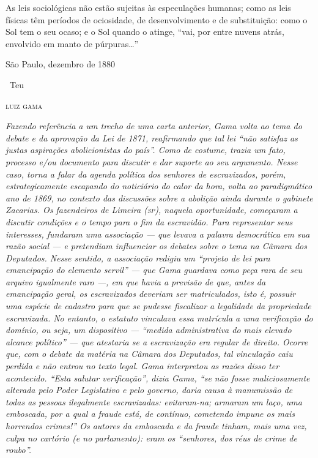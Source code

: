 {As leis sociológicas não estão sujeitas às especulações humanas; como as
leis físicas têm períodos de ociosidade, de desenvolvimento e de
substituição: como o Sol tem o seu ocaso; e o Sol quando o atinge, ``vai,
por entre nuvens atrás, envolvido em manto de púrpuras\ldots{}''

\medskip

\hfill São Paulo, dezembro de 1880

\hfill\ Teu

\hfill\textsc{luiz gama}


\begin{resumo}
\emph{Fazendo referência a um trecho de uma carta anterior, Gama volta
ao tema do debate e da aprovação da Lei de 1871, reafirmando que tal lei
``não satisfaz as justas aspirações abolicionistas do país''. Como de
costume, trazia um fato, processo e/ou documento para discutir e dar
suporte ao seu argumento. Nesse caso, torna a falar da agenda política
dos senhores de escravizados, porém, estrategicamente escapando do
noticiário do calor da hora, volta ao paradigmático ano de 1869, no
contexto das discussões sobre a abolição ainda durante o gabinete
Zacarias. Os fazendeiros de Limeira (\textsc{sp}), naquela oportunidade,
começaram a discutir condições e o tempo para o fim da escravidão. Para
representar seus interesses, fundaram uma associação --- que levava a
palavra democrática em sua razão social --- e pretendiam influenciar os
debates sobre o tema na Câmara dos Deputados. Nesse sentido, a
associação redigiu um ``projeto de lei para emancipação do elemento
servil'' --- que Gama guardava como peça rara de seu arquivo igualmente
raro ---, em que havia a previsão de que, antes da emancipação geral, os
escravizados deveriam ser matriculados, isto é, possuir uma espécie de
cadastro para que se pudesse fiscalizar a legalidade da propriedade
escravizada. No entanto, o estatuto vinculava essa matrícula a uma
verificação do domínio, ou seja, um dispositivo --- ``medida
administrativa do mais elevado alcance político'' --- que atestaria se a
escravização era regular de direito. Ocorre que, com o debate da matéria
na Câmara dos Deputados, tal vinculação caiu perdida e não entrou no
texto legal. Gama interpretou as razões disso ter acontecido. ``Esta
salutar verificação'', dizia Gama, ``se não fosse maliciosamente alterada
pelo Poder Legislativo e pelo governo, daria causa à manumissão de todas
as pessoas ilegalmente escravizadas: evitaram-na; armaram um laço, uma
emboscada, por a qual a fraude está, de contínuo, cometendo impune os
mais horrendos crimes!'' Os autores da emboscada e da fraude tinham, mais
uma vez, culpa no cartório (e no parlamento): eram os ``senhores, dos
réus de crime de roubo''.}
\end{resumo}\pagebreak

}

